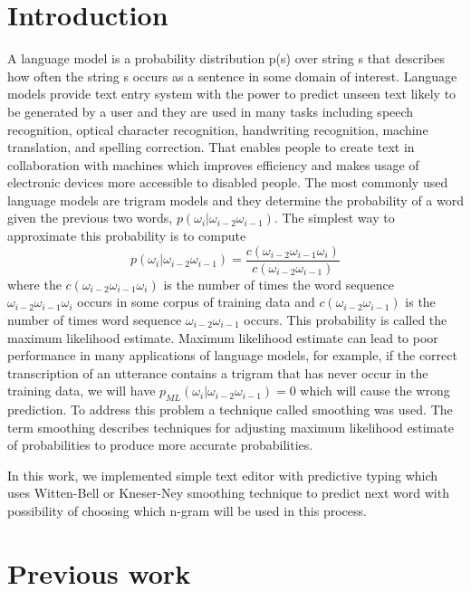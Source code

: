 \documentclass[twoside]{article}
\begin{document}
\begin{multicols}{2}

\section{Introduction}
A language model is a probability distribution p(s) over string s that describes how often the string s occurs as a sentence in some domain of interest. 
Language models provide text entry system with the power to predict unseen text likely to be generated by a user and they are used in many tasks including speech recognition, optical character recognition, handwriting recognition, machine translation, and spelling correction.  That enables people to create text in collaboration with machines which improves efficiency and makes usage of electronic devices more accessible to disabled people. The most commonly used language models are trigram models and they determine the probability of a word given the previous two words, $ p(\omega_i|\omega_{i-2}\omega_{i-1}) $. The simplest way to approximate this probability is to compute 
\begin{equation}
p(\omega_i|\omega_{i-2}\omega_{i-1}) = \frac{c(\omega_{i-2}\omega_{i-1}\omega_i)}{c(\omega_{i-2}\omega_{i-1})}
\end{equation}
where the $ c(\omega_{i-2}\omega_{i-1}\omega_i) $ is the number of times the word sequence $ \omega_{i-2}\omega_{i-1}\omega_i $ occurs in some corpus of training data and $ c(\omega_{i-2}\omega_{i-1}) $ is the number of times word sequence $ \omega_{i-2}\omega_{i-1} $ occurs. This probability is called the maximum likelihood estimate. Maximum likelihood estimate can lead to poor performance in many applications of language models, for example, if the correct transcription of an utterance contains a trigram that has never occur in the training data, we will have $ p_{ML}(\omega_i|\omega_{i-2}\omega_{i-1})=0 $ which will cause the wrong prediction. To address this problem a technique called smoothing was used. The term smoothing describes techniques for adjusting maximum likelihood estimate of probabilities to produce more accurate probabilities. 

In this work, we implemented simple text editor with predictive typing which uses Witten-Bell or Kneser-Ney smoothing technique to predict next word with possibility of choosing which n-gram will be used in this process.  

\section{Previous work}


\end{multicols}
\end{document}
